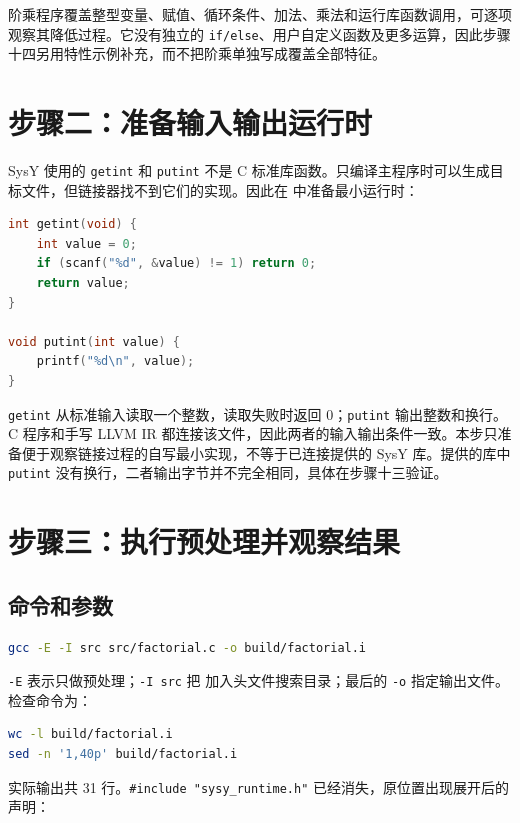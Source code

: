 \documentclass[UTF8,a4paper,12pt]{ctexart}
\begin{document}
阶乘程序覆盖整型变量、赋值、循环条件、加法、乘法和运行库函数调用，可逐项观察其降低过程。它没有独立的 \texttt{if/else}、用户自定义函数及更多运算，因此步骤十四另用特性示例补充，而不把阶乘单独写成覆盖全部特征。

\section{步骤二：准备输入输出运行时}

SysY 使用的 \texttt{getint} 和 \texttt{putint} 不是 C 标准库函数。只编译主程序时可以生成目标文件，但链接器找不到它们的实现。因此在  中准备最小运行时：

\begin{lstlisting}[language=C]
int getint(void) {
    int value = 0;
    if (scanf("%d", &value) != 1) return 0;
    return value;
}

void putint(int value) {
    printf("%d\n", value);
}
\end{lstlisting}

\texttt{getint} 从标准输入读取一个整数，读取失败时返回 0；\texttt{putint} 输出整数和换行。C 程序和手写 LLVM IR 都连接该文件，因此两者的输入输出条件一致。本步只准备便于观察链接过程的自写最小实现，不等于已连接提供的 SysY 库。提供的库中 \texttt{putint} 没有换行，二者输出字节并不完全相同，具体在步骤十三验证。

\section{步骤三：执行预处理并观察结果}

\subsection{命令和参数}

\begin{lstlisting}[language=bash]
gcc -E -I src src/factorial.c -o build/factorial.i
\end{lstlisting}

\texttt{-E} 表示只做预处理；\texttt{-I src} 把  加入头文件搜索目录；最后的 \texttt{-o} 指定输出文件。检查命令为：

\begin{lstlisting}[language=bash]
wc -l build/factorial.i
sed -n '1,40p' build/factorial.i
\end{lstlisting}

实际输出共 31 行。\texttt{\#include "sysy\_runtime.h"} 已经消失，原位置出现展开后的声明：
\end{document}
